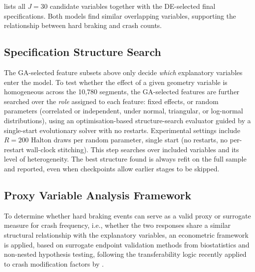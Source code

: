 \documentclass[letterpaper,8pt]{extarticle}  %
\begin{document}
\begin{doublespacing}
\begin{linenumbers}
 lists all $J=30$ candidate variables together with the DE-selected final specifications. Both models find similar overlapping variables, supporting the relationship between hard braking and crash counts.



\FloatBarrier




\subsection{Specification Structure Search}\label{sec:mcr-method}

The GA-selected feature subsets above only decide \emph{which} explanatory variables enter the model. To test whether the effect of a given geometry variable is homogeneous across the 10,780 segments, the GA-selected features are further searched over the \emph{role} assigned to each feature: fixed effects, or random parameters (correlated or independent, under normal, triangular, or log-normal distributions), using an optimisation-based structure-search evaluator guided by a single-start evolutionary solver with no restarts. Experimental settings include $R=200$ Halton draws per random parameter, single start (no restarts, no per-restart wall-clock stitching). This step searches over included variables and its level of heterogeneity. The best structure found is always refit on the full sample and reported, even when checkpoints allow earlier stages to be skipped. 



\subsection{Proxy Variable Analysis Framework}\label{sec:proxy-method}

To determine whether hard braking events can serve as a valid proxy or surrogate measure for crash frequency, i.e., whether the two responses share a similar structural relationship with the explanatory variables, an econometric framework is applied, based on surrogate endpoint validation methods from biostatistics \citep{Nikolaou2023AInvestigations} and non-nested hypothesis testing, following the transferability logic recently applied to crash modification factors by \citet{Davis2025TransferringConsiderations}.


\end{linenumbers}
\end{doublespacing}
\end{document}

